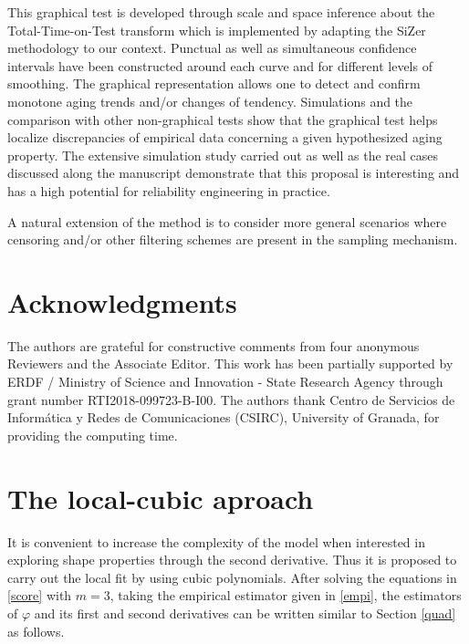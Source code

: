\documentclass[preprint,12pt]{elsarticle}
\begin{document}
  This graphical test is developed through scale and space inference about the Total-Time-on-Test transform which is implemented by adapting the SiZer methodology to our context. Punctual as well as simultaneous confidence intervals have been constructed around each curve and for different levels of smoothing. The graphical representation allows one to detect and confirm monotone aging trends and/or changes of tendency.
Simulations and the comparison with other non-graphical tests show that the graphical test helps localize discrepancies of empirical data concerning a given hypothesized aging property. The extensive simulation study carried out as well as the real cases discussed along the manuscript demonstrate that this proposal is interesting and has a high potential for reliability engineering in practice. 

A natural extension of the method is to consider more general scenarios where censoring and/or other filtering schemes are present in the sampling mechanism.



\section*{Acknowledgments} The authors are grateful for constructive comments from four anonymous Reviewers and the Associate Editor. This work has been partially supported by ERDF / Ministry of Science and Innovation - State Research Agency through grant number RTI2018-099723-B-I00. The authors thank Centro de Servicios de Inform\'atica y Redes de Comunicaciones (CSIRC), University of Granada, for providing the computing time. 


%

\appendix

\section{The local-cubic aproach} \label{ap:cubic}
It is convenient to increase the complexity of the model when interested in exploring shape properties through the second derivative.
Thus it is proposed to carry out the local fit by using cubic polynomials. After solving the equations in \eqref{score} with $m=3$, taking  the empirical estimator given in \eqref{empi},  the estimators of $\varphi$ and its first and second derivatives can be written similar to Section \ref{quad} as follows.
%
\end{document}
